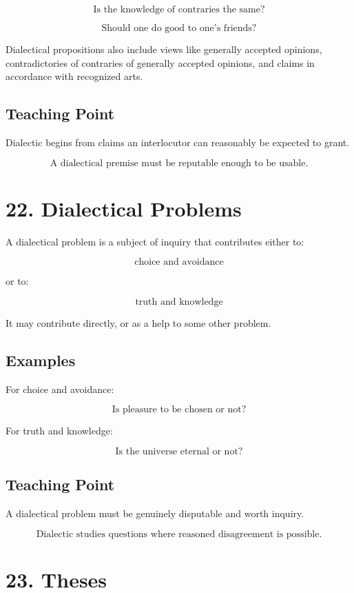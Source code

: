 \documentclass[12pt]{article}
\begin{document}
\[
\text{Is the knowledge of contraries the same?}
\]

\[
\text{Should one do good to one's friends?}
\]

Dialectical propositions also include views like generally accepted opinions,
contradictories of contraries of generally accepted opinions, and claims in
accordance with recognized arts.

\subsection*{Teaching Point}

Dialectic begins from claims an interlocutor can reasonably be expected to
grant.

\[
\boxed{
\text{A dialectical premise must be reputable enough to be usable.}
}
\]

\section*{22. Dialectical Problems}

A dialectical problem is a subject of inquiry that contributes either to:

\[
\text{choice and avoidance}
\]

or to:

\[
\text{truth and knowledge}
\]

It may contribute directly, or as a help to some other problem.

\subsection*{Examples}

For choice and avoidance:

\[
\text{Is pleasure to be chosen or not?}
\]

For truth and knowledge:

\[
\text{Is the universe eternal or not?}
\]

\subsection*{Teaching Point}

A dialectical problem must be genuinely disputable and worth inquiry.

\[
\boxed{
\text{Dialectic studies questions where reasoned disagreement is possible.}
}
\]

\section*{23. Theses}
\end{document}
